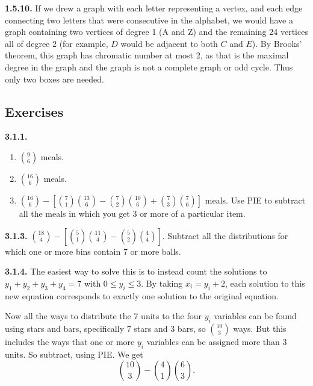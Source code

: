 \documentclass[10pt,]{book}
\theoremstyle{plain}
\theoremstyle{definition}
\theoremstyle{definition}
\theoremstyle{definition}
\theoremstyle{definition}
\numberwithin{equation}{chapter}
\begin{document}
\par\smallskip
\noindent\textbf{1.5.10.} \hypertarget{p-371}{}%
If we drew a graph with each letter representing a vertex, and each edge connecting two letters that were consecutive in the alphabet, we would have a graph containing two vertices of degree 1 (A and Z) and the remaining 24 vertices all of degree 2 (for example, \(D\) would be adjacent to both \(C\) and \(E\)). By Brooks' theorem, this graph has chromatic number at most 2, as that is the maximal degree in the graph and the graph is not a complete graph or odd cycle. Thus only two boxes are needed.%
\par\smallskip
\subsection*{ Exercises}
\noindent\textbf{3.1.1.} \hypertarget{p-1030}{}%
\leavevmode%
\begin{enumerate}[label=(\alph*)]
\item\hypertarget{li-151}{}\({9 \choose 6}\) meals.%
\item\hypertarget{li-152}{}\({16 \choose 6}\) meals.%
\item\hypertarget{li-153}{}\({16 \choose 6} - \left[{7 \choose 1}{13 \choose 6} - {7 \choose 2}{10 \choose 6} + {7 \choose 3}{7 \choose 6}\right]\) meals.  Use PIE to subtract all the meals in which you get 3 or more of a particular item.%
\end{enumerate}
%
\par\smallskip
\noindent\textbf{3.1.3.} \hypertarget{p-1036}{}%
\({18 \choose 4} - \left[ {5 \choose 1}{11 \choose 4} - {5 \choose 2}{4 \choose 4}\right]\). Subtract all the distributions for which one or more bins contain 7 or more balls.%
\par\smallskip
\noindent\textbf{3.1.4.} \hypertarget{p-1038}{}%
The easiest way to solve this is to instead count the solutions to \(y_1 + y_2 + y_3 + y_4 = 7\) with \(0 \le y_i \le 3\). By taking \(x_i = y_i+2\), each solution to this new equation corresponds to exactly one solution to the original equation.%
\par
\hypertarget{p-1039}{}%
Now all the ways to distribute the 7 units to the four \(y_i\) variables can be found using stars and bars, specifically 7 stars and 3 bars, so \({10 \choose 3}\) ways. But this includes the ways that one or more \(y_i\) variables can be assigned more than 3 units. So subtract, using PIE. We get%
\begin{equation*}
{10 \choose 3} - {4\choose 1} {6 \choose 3}.
\end{equation*}
\end{document}
